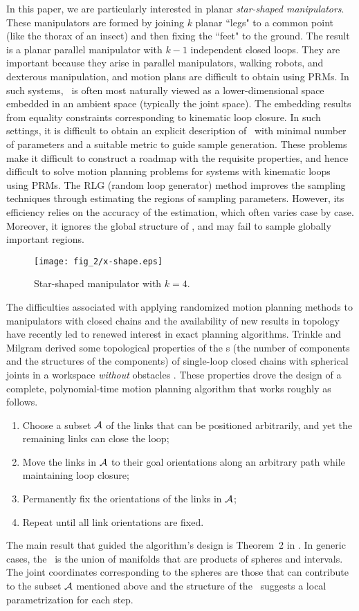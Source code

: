 In this paper, we are particularly interested in planar {\sl
star-shaped manipulators}. These manipulators are formed by
joining $k$ planar ``legs" to a common point (like the thorax of
an insect) and then fixing the ``feet" to the ground.  The result
is a planar parallel manipulator with $k-1$ independent closed
loops. They are important because they arise in parallel
manipulators, walking robots, and dexterous manipulation, and
motion plans are difficult to obtain using PRMs. In such systems,
\cspace \ is often most naturally viewed as a lower-dimensional
space embedded in an ambient space (typically the joint space).
The embedding results from equality constraints corresponding to
kinematic loop closure. In such settings, it is difficult to
obtain an explicit description of \cspace \ with minimal number of
parameters and a suitable metric to guide sample generation. These
problems make it difficult to construct a roadmap with the
requisite properties, and hence difficult  to solve motion
planning problems for systems with kinematic loops using PRMs. The
RLG (random loop generator) method \cite{Cortes02,CS03} improves
the sampling techniques through estimating the regions of sampling
parameters. However, its efficiency relies on the accuracy of the
estimation, which often varies case by case. Moreover, it ignores
the global structure of \cspace, and may fail to sample globally
important regions.
%
\begin{figure}
  \centering
  \texttt{[image: fig\_2/x-shape.eps]}
  \caption{Star-shaped manipulator with $k=4$.}
  \label{X-shape}
\end{figure}
%
The difficulties associated with applying randomized motion
planning methods to manipulators with closed chains and the
availability of new results in topology \cite{KTT,KM,MT1,SSB05}
have recently led to renewed interest in exact planning
algorithms. Trinkle and Milgram derived some topological
properties of the \cspace s (the number of components and the
structures of the components) of single-loop closed chains with
spherical joints in a workspace {\em without} obstacles
\cite{MT2,MT1}.  These properties drove the design of a complete,
polynomial-time motion planning algorithm that works roughly as
follows.
%
\begin{enumerate}
\item Choose a subset ${\cal A}$ of the links that can be
positioned arbitrarily, and yet the remaining links can close the
loop; \item Move the links in ${\cal A}$ to their goal
orientations along an arbitrary path while maintaining loop
closure; \item Permanently fix the orientations of the links in
${\cal A}$; \item Repeat until all link orientations are fixed.
\end{enumerate}
%
The main result that guided the algorithm's design is Theorem~2 in
\cite{MT1}. In generic cases, the \cspace \ is the union of
manifolds that are products of spheres and intervals. The joint
coordinates corresponding to the spheres are those that can
contribute to the subset ${\cal A}$ mentioned above and the
structure of the \cspace \ suggests a local parametrization for
each step.

